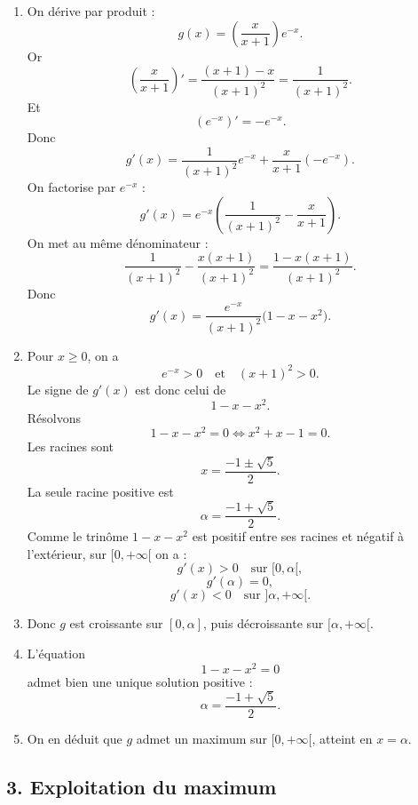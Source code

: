 \documentclass[11pt,a4paper]{article}
\begin{document}
\begin{enumerate}
    \item On dérive par produit :
    \[
    g(x)=\left(\frac{x}{x+1}\right)e^{-x}.
    \]
    Or
    \[
    \left(\frac{x}{x+1}\right)'=\frac{(x+1)-x}{(x+1)^2}=\frac{1}{(x+1)^2}.
    \]
    Et
    \[
    (e^{-x})'=-e^{-x}.
    \]
    Donc
    \[
    g'(x)=\frac{1}{(x+1)^2}e^{-x}+\frac{x}{x+1}(-e^{-x}).
    \]
    On factorise par \(e^{-x}\) :
    \[
    g'(x)=e^{-x}\left(\frac{1}{(x+1)^2}-\frac{x}{x+1}\right).
    \]
    On met au même dénominateur :
    \[
    \frac{1}{(x+1)^2}-\frac{x(x+1)}{(x+1)^2}
    =\frac{1-x(x+1)}{(x+1)^2}.
    \]
    Donc
    \[
    g'(x)=\frac{e^{-x}}{(x+1)^2}\bigl(1-x-x^2\bigr).
    \]

    \item Pour \(x\geq 0\), on a
    \[
    e^{-x}>0 \quad \text{et} \quad (x+1)^2>0.
    \]
    Le signe de \(g'(x)\) est donc celui de
    \[
    1-x-x^2.
    \]
    Résolvons
    \[
    1-x-x^2=0 \iff x^2+x-1=0.
    \]
    Les racines sont
    \[
    x=\frac{-1\pm \sqrt{5}}{2}.
    \]
    La seule racine positive est
    \[
    \alpha=\frac{-1+\sqrt{5}}{2}.
    \]
    Comme le trinôme \(1-x-x^2\) est positif entre ses racines et négatif à l'extérieur, sur \([0,+\infty[\) on a :
    \[
    g'(x)>0 \quad \text{sur } [0,\alpha[,
    \]
    \[
    g'(\alpha)=0,
    \]
    \[
    g'(x)<0 \quad \text{sur } ]\alpha,+\infty[.
    \]

    \item Donc \(g\) est croissante sur \([0,\alpha]\), puis décroissante sur \([\alpha,+\infty[\).

    \item L'équation
    \[
    1-x-x^2=0
    \]
    admet bien une unique solution positive :
    \[
    \alpha=\frac{-1+\sqrt{5}}{2}.
    \]

    \item On en déduit que \(g\) admet un maximum sur \([0,+\infty[\), atteint en \(x=\alpha\).
\end{enumerate}

\subsection*{3. Exploitation du maximum}
\end{document}
